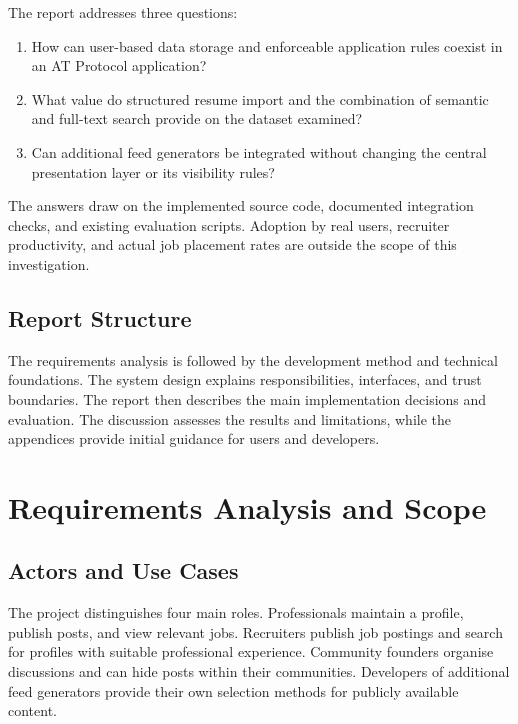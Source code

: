 \documentclass[11pt,a4paper]{article}
\begin{document}
The report addresses three questions:

\begin{enumerate}
  \item How can user-based data storage and enforceable application rules coexist in an AT Protocol application?
  \item What value do structured resume import and the combination of semantic and full-text search provide on the dataset examined?
  \item Can additional feed generators be integrated without changing the central presentation layer or its visibility rules?
\end{enumerate}

The answers draw on the implemented source code, documented integration checks, and existing evaluation scripts. Adoption by real users, recruiter productivity, and actual job placement rates are outside the scope of this investigation.

\subsection{Report Structure}

The requirements analysis is followed by the development method and technical foundations. The system design explains responsibilities, interfaces, and trust boundaries. The report then describes the main implementation decisions and evaluation. The discussion assesses the results and limitations, while the appendices provide initial guidance for users and developers.

\section{Requirements Analysis and Scope}

\subsection{Actors and Use Cases}

The project distinguishes four main roles. Professionals maintain a profile, publish posts, and view relevant jobs. Recruiters publish job postings and search for profiles with suitable professional experience. Community founders organise discussions and can hide posts within their communities. Developers of additional feed generators provide their own selection methods for publicly available content.
\end{document}
